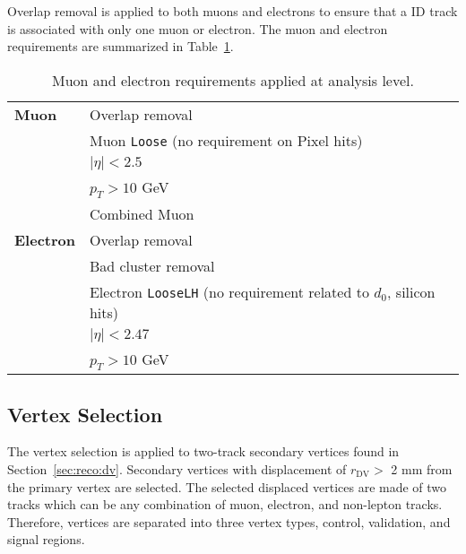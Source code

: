 Overlap removal is applied to both muons and electrons to ensure that a ID track is associated with only one muon or electron. The muon and electron requirements are summarized in Table~\ref{table:lepton_requirement}.

\begin{table}[!htb]
  \centering
  \begin{tabular}{ l  l }
    \hline
    \hline
    \textbf{Muon}     &       Overlap removal                                                                      \\
                                  &       Muon \texttt{Loose} (no requirement on Pixel hits)                       \\
                                  &       $|\eta| < 2.5$                                                           \\
                                  &       $p_{T} > 10$ GeV                                                         \\
                                  &       Combined Muon                                                            \\
    \hline
    \textbf{Electron} &       Overlap removal                                                                      \\
                                  &       Bad cluster removal                                                      \\
                                  &       Electron \texttt{LooseLH} (no requirement related to $d_{0}$, silicon hits)\\
                                  &       $|\eta| < 2.47$                                                          \\
                                  &       $p_{T} > 10$ GeV                                                         \\
    \hline
    \hline
  \end{tabular}
  \caption{Muon and electron requirements applied at analysis level.}
  \label{table:lepton_requirement}
\end{table}







\subsection{Vertex Selection}
\label{sec:vertex_selection}
The vertex selection is applied to two-track secondary vertices found in Section~\ref{sec:reco:dv}. Secondary vertices with displacement of $r_{\mathrm{DV}}>$ 2 mm from the primary vertex are selected. The selected displaced vertices are made of two tracks which can be any combination of muon, electron, and non-lepton tracks. Therefore, vertices are separated into three vertex types, control, validation, and signal regions.

